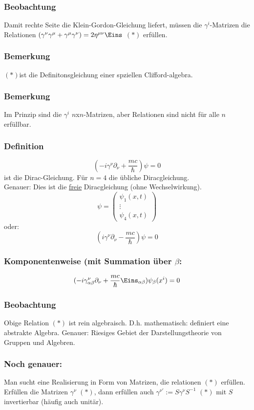 \documentclass[twoside,a4paper]{scrartcl}
\renewcommand{\1}{\mathds{1}}
\begin{document}
\subsubsection*{Beobachtung}
Damit rechte Seite die Klein-Gordon-Gleichung liefert, müssen die $\gamma^i$-Matrizen die Relationen $(\gamma^\nu\gamma^\mu+\gamma^\mu\gamma^\nu)=2 \eta^{\mu\nu}\Eins$ $(*)$ erfüllen.
\subsubsection*{Bemerkung}
$(*)$ist die Definitonsgleichung einer spziellen Clifford-algebra.
\subsubsection*{Bemerkung}
Im Prinzip sind die $\gamma^i$ $n$x$n$-Matrizen, aber Relationen sind nicht für alle $n$ erfüllbar.
\subsubsection*{Definition}
$$(-i\gamma^\nu\partial_\nu+\frac{mc}{\hbar})\psi=0$$
ist die Dirac-Gleichung. Für $n=4$ die übliche Diracgleichung.\\
Genauer: Dies ist die \underline{freie} Diracgleichung (ohne Wechselwirkung).
$$\psi=\begin{pmatrix} \psi_1(x,t) \\ \vdots \\ \psi_4(x,t)\end{pmatrix}$$
oder: $$(i\gamma^\nu\partial_\nu-\frac{mc}{\hbar})\psi=0$$
\subsubsection*{Komponentenweise (mit Summation über $\beta$:}
$$(-i\gamma^\nu_{\alpha\beta}\partial_\nu+\frac{mc}{\hbar} \Eins_{\alpha\beta})\psi_\beta(x^i)=0$$
\subsubsection*{Beobachtung}
Obige Relation $(*)$ ist rein algebraisch. D.h. mathematisch: definiert eine abstrakte Algebra. Genauer: Riesiges Gebiet der Darstellungstheorie von Gruppen und Algebren.
\subsubsection*{Noch genauer:}
Man sucht eine Realisierung in Form von Matrizen, die relationen $(*)$ erfüllen.\\
Erfüllen die Matrizen $\gamma^\nu$ $(*)$, dann erfüllen auch $\gamma^{\nu'}:=S\gamma^\nu S^{-1}$ $(*)$ mit $S$ invertierbar (häufig auch unitär).
\end{document}

